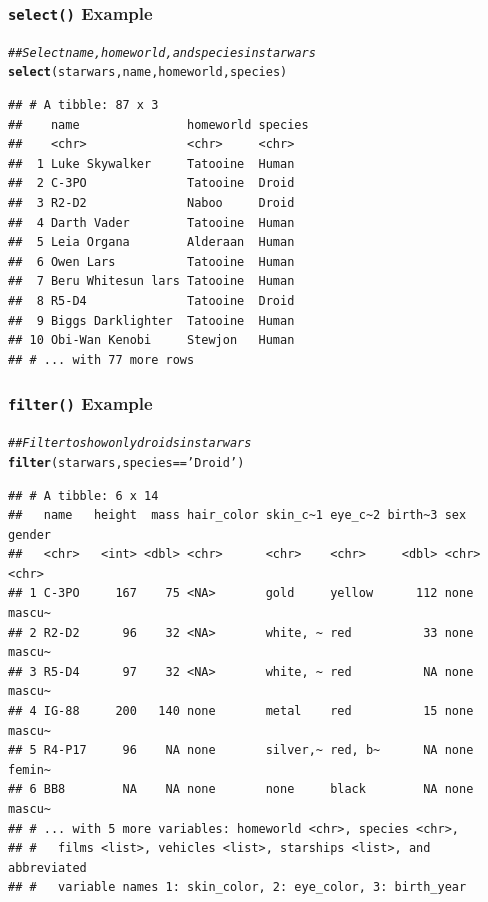 \documentclass{beamer}\usepackage[]{graphicx}\usepackage[]{xcolor}
\makeatletter
\newcommand{\hlstr}[1]{\textcolor[rgb]{0.192,0.494,0.8}{#1}}%
\newcommand{\hlcom}[1]{\textcolor[rgb]{0.678,0.584,0.686}{\textit{#1}}}%
\newcommand{\hlopt}[1]{\textcolor[rgb]{0,0,0}{#1}}%
\newcommand{\hlstd}[1]{\textcolor[rgb]{0.345,0.345,0.345}{#1}}%
\newcommand{\hlkwd}[1]{\textcolor[rgb]{0.737,0.353,0.396}{\textbf{#1}}}%
\newenvironment{kframe}{%
 \def\at@end@of@kframe{}%
 \ifinner\ifhmode%
  \def\at@end@of@kframe{\end{minipage}}%
  \begin{minipage}{\columnwidth}%
 \fi\fi%
 \def\FrameCommand##1{\hskip\@totalleftmargin \hskip-\fboxsep
 \colorbox{shadecolor}{##1}\hskip-\fboxsep
     \hskip-\linewidth \hskip-\@totalleftmargin \hskip\columnwidth}%
 \MakeFramed {\advance\hsize-\width
   \@totalleftmargin\z@ \linewidth\hsize
   \@setminipage}}%
 {\par\unskip\endMakeFramed%
 \at@end@of@kframe}
\newenvironment{knitrout}{}{} %
\makeatother
\begin{document}
\begin{frame}[fragile]\frametitle{\texttt{select()} Example}
\begin{knitrout}\footnotesize
{}\color{fgcolor}\begin{kframe}
\begin{alltt}
\hlcom{## Select name, homeworld, and species in starwars}
\hlkwd{select}\hlstd{(starwars, name, homeworld, species)}
\end{alltt}
\begin{verbatim}
## # A tibble: 87 x 3
##    name               homeworld species
##    <chr>              <chr>     <chr>  
##  1 Luke Skywalker     Tatooine  Human  
##  2 C-3PO              Tatooine  Droid  
##  3 R2-D2              Naboo     Droid  
##  4 Darth Vader        Tatooine  Human  
##  5 Leia Organa        Alderaan  Human  
##  6 Owen Lars          Tatooine  Human  
##  7 Beru Whitesun lars Tatooine  Human  
##  8 R5-D4              Tatooine  Droid  
##  9 Biggs Darklighter  Tatooine  Human  
## 10 Obi-Wan Kenobi     Stewjon   Human  
## # ... with 77 more rows
\end{verbatim}
\end{kframe}
\end{knitrout}
\end{frame}

\begin{frame}[fragile]\frametitle{\texttt{filter()} Example}
\begin{knitrout}\footnotesize
{}\color{fgcolor}\begin{kframe}
\begin{alltt}
\hlcom{## Filter to show only droids in starwars}
\hlkwd{filter}\hlstd{(starwars, species} \hlopt{==} \hlstr{'Droid'}\hlstd{)}
\end{alltt}
\begin{verbatim}
## # A tibble: 6 x 14
##   name   height  mass hair_color skin_c~1 eye_c~2 birth~3 sex   gender
##   <chr>   <int> <dbl> <chr>      <chr>    <chr>     <dbl> <chr> <chr> 
## 1 C-3PO     167    75 <NA>       gold     yellow      112 none  mascu~
## 2 R2-D2      96    32 <NA>       white, ~ red          33 none  mascu~
## 3 R5-D4      97    32 <NA>       white, ~ red          NA none  mascu~
## 4 IG-88     200   140 none       metal    red          15 none  mascu~
## 5 R4-P17     96    NA none       silver,~ red, b~      NA none  femin~
## 6 BB8        NA    NA none       none     black        NA none  mascu~
## # ... with 5 more variables: homeworld <chr>, species <chr>,
## #   films <list>, vehicles <list>, starships <list>, and abbreviated
## #   variable names 1: skin_color, 2: eye_color, 3: birth_year
\end{verbatim}
\end{kframe}
\end{knitrout}
\end{frame}
\end{document}
